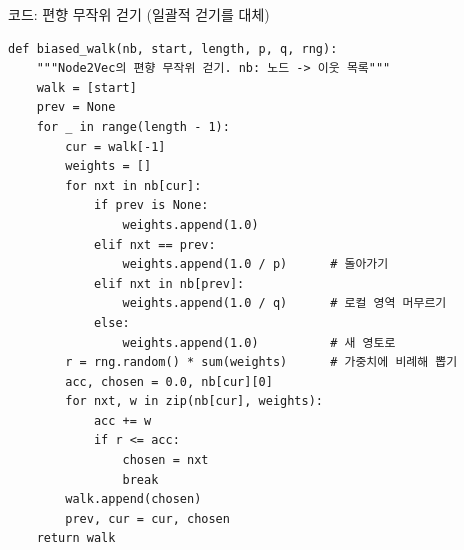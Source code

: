 \begin{frame}[fragile,shrink=21]{코드: 편향 무작위 걷기 (일괄적 걷기를 대체)}
\begin{lstlisting}
def biased_walk(nb, start, length, p, q, rng):
    """Node2Vec의 편향 무작위 걷기. nb: 노드 -> 이웃 목록"""
    walk = [start]
    prev = None
    for _ in range(length - 1):
        cur = walk[-1]
        weights = []
        for nxt in nb[cur]:
            if prev is None:
                weights.append(1.0)
            elif nxt == prev:
                weights.append(1.0 / p)      # 돌아가기
            elif nxt in nb[prev]:
                weights.append(1.0 / q)      # 로컬 영역 머무르기
            else:
                weights.append(1.0)          # 새 영토로
        r = rng.random() * sum(weights)      # 가중치에 비례해 뽑기
        acc, chosen = 0.0, nb[cur][0]
        for nxt, w in zip(nb[cur], weights):
            acc += w
            if r <= acc:
                chosen = nxt
                break
        walk.append(chosen)
        prev, cur = cur, chosen
    return walk
\end{lstlisting}
\end{frame}
